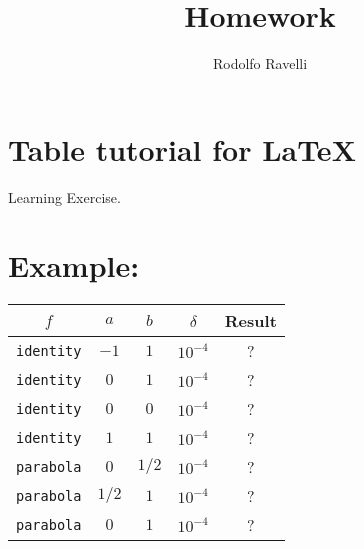 \documentclass[12pt]{article}
\title{Homework}
\author{Rodolfo Ravelli}
\begin{document}
\maketitle
\thispagestyle{empty}
\section*{Table tutorial for LaTeX}
\vspace{2mm}
\hspace{1mm}Learning Exercise.

\section*{Example:}

\begin{center}
\begin{tabular}{ccccc}
$f$ & $a$ & $b$ & $\delta$ & Result \\ \hline
\texttt{identity} & $-1$ & $1$ & $10^{-4}$ & ? \\
\texttt{identity} & $0$ & $1$ & $10^{-4}$ & ? \\
\texttt{identity} & $0$ & $0$ & $10^{-4}$ & ? \\
\texttt{identity} & $1$ & $1$ & $10^{-4}$ & ? \\
\texttt{parabola} & $0$ & $1/2$ & $10^{-4}$ & ? \\
\texttt{parabola} & $1/2$ & $1$ & $10^{-4}$ & ? \\
\texttt{parabola} & $0$ & $1$ & $10^{-4}$ & ?
\end{tabular}
\end{center}
\end{document}
